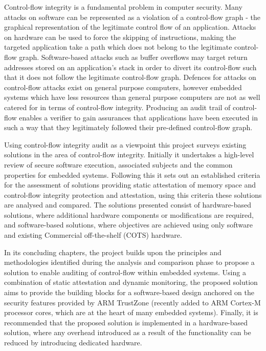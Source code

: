 Control-flow integrity is a fundamental problem in computer security. Many attacks on software can be represented as a violation of a control-flow graph - the graphical representation of the legitimate control flow of an application. Attacks on hardware can be used to force the skipping of instructions, making the targeted application take a path which does not belong to the legitimate control-flow graph. Software-based attacks such as buffer overflows may target return addresses stored on an application's stack in order to divert its control-flow such that it does not follow the legitimate control-flow graph. Defences for attacks on control-flow attacks exist on general purpose computers, however embedded systems which have less resources than general purpose computers are not as well catered for in terms of control-flow integrity. Producing an audit trail of control-flow enables a verifier to gain assurances that applications have been executed in such a way that they legitimately followed their pre-defined control-flow graph.

Using control-flow integrity audit as a viewpoint this project surveys existing solutions in the area of control-flow integrity. Initially it undertakes a high-level review of secure software execution, associated subjects and the common properties for embedded systems. Following this it sets out an established criteria for the assessment of solutions providing static attestation of memory space and control-flow integrity protection and attestation, using this criteria these solutions are analysed and compared. The solutions presented consist of hardware-based solutions, where additional hardware components or modifications are required, and software-based solutions, where objectives are achieved using only software and existing Commercial off-the-shelf (COTS) hardware.

In its concluding chapters, the project builds upon the principles and methodologies identified during the analysis and comparison phase to propose a solution to enable auditing of control-flow within embedded systems. Using a combination of static attestation and dynamic monitoring, the proposed solution aims to provide the building blocks for a software-based design anchored on the security features provided by ARM TrustZone (recently added to ARM Cortex-M processor cores, which are at the heart of many embedded systems). Finally, it is recommended that the proposed solution is implemented in a hardware-based solution, where any overhead introduced as a result of the functionality can be reduced by introducing dedicated hardware.
